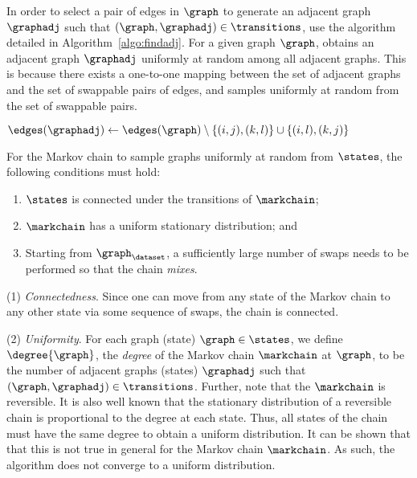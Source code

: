 In order to select a pair of edges in $\graph$ to generate an adjacent graph
$\graphadj$ such that $(\graph, \graphadj) \in \transitions$,
\citet{GionisMMT07} use the \findadj{} algorithm detailed in
Algorithm~\ref{algo:findadj}. For a given graph $\graph$, \findadj{} obtains an
adjacent graph $\graphadj$ uniformly at random among all adjacent graphs. This
is because there exists a one-to-one mapping between the set of adjacent graphs
and the set of swappable pairs of edges, and \findadj{} samples uniformly at
random from the set of swappable pairs.

\begin{algorithm}
	\caption{\findadj}\label{algo:findadj}
	\DontPrintSemicolon{}

	$\edges(\graphadj) \leftarrow \edges(\graph) \setminus \{(i, j), (k, l)\}
	\cup \{(i, l), (k, j)\}$\;
	\Return{$\graphadj$}
\end{algorithm}

For the Markov chain to sample graphs uniformly at random from $\states$, the
following conditions must hold:

\begin{enumerate}
	\item $\states$ is connected under the transitions of $\markchain$;
	\item $\markchain$ has a uniform stationary distribution; and
	\item Starting from $\graph_\dataset$, a sufficiently large number of swaps
		needs to be performed so that the chain \textit{mixes}.
\end{enumerate}

(1) \textit{Connectedness}. Since one can move from any state of the Markov
chain to any other state via some sequence of swaps, the chain is connected.

(2) \textit{Uniformity}. For each graph (state) $\graph \in \states$, we define
$\degree{\graph}$, the \textit{degree} of the Markov chain $\markchain$ at
$\graph$, to be the number of adjacent graphs (states) $\graphadj$ such that
$(\graph, \graphadj) \in \transitions$. Further, note that the $\markchain$ is
reversible. It is also well known that the stationary distribution of a
reversible chain is proportional to the degree at each state. Thus, all states
of the chain must have the same degree to obtain a uniform distribution. It can
be shown that that this is not true in general for the Markov chain $\markchain$.
As such, the \naive{} algorithm does not converge to a uniform distribution.

